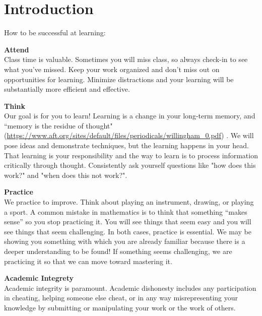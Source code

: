 \newpage
\section*{Introduction}

How to be successful at learning:
\\ \vspace{5mm}

\noindent
\textbf{Attend} \\ 
Class time is valuable.  
Sometimes you will miss class, so always check-in to see what you’ve missed.  Keep your work organized and don’t miss out on opportunities for learning.  
Minimize distractions and your learning will be substantially more efficient and effective.
\\ \vspace{5mm}

\noindent
\textbf{Think} \\
Our goal is for you to learn!  Learning is a change in your long-term memory, and “memory is the residue of thought" {\small (\url{https://www.aft.org/sites/default/files/periodicals/willingham_0.pdf}) }.
We will pose ideas and demonstrate techniques, but the learning happens in your head.  
That learning is your responsibility and the way to learn is to process information critically through thought.
Consistently ask yourself questions like "how does this work?" and "when does this not work?".
\\ \vspace{5mm}

\noindent
\textbf{Practice} \\  
We practice to improve.  
Think about playing an instrument, drawing, or playing a sport.  
A common mistake in mathematics is to think that something “makes sense” so you stop practicing it.  
You will see things that seem easy and you will see things that seem challenging.  
In both cases, practice is essential.  
We may be showing you something with which you are already familiar because there is a deeper understanding to be found!  
If something seems challenging, we are practicing it so that we can move toward mastering it.  
\\ \vspace{5mm}

\noindent
\textbf{Academic Integrety} \\ 
Academic integrity is paramount. 
Academic dishonesty includes any participation in cheating, helping someone else cheat, or in any way misrepresenting your knowledge by submitting or manipulating your work or the work of others. 
